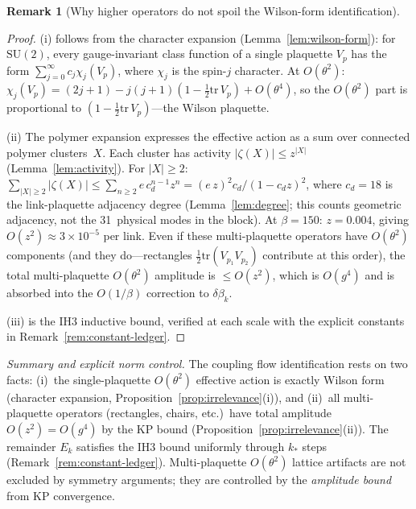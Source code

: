 \documentclass[11pt]{article}
\theoremstyle{definition}
\newtheorem{remark}[theorem]{Remark}
\newcommand{\SU}{\mathrm{SU}}
\newcommand{\tr}{\mathrm{tr}}
\begin{document}
\begin{remark}[Why higher operators do not spoil the Wilson-form identification]
\begin{proof}
(i) follows from the character expansion
(Lemma~\ref{lem:wilson-form}): for $\SU(2)$, every
gauge-invariant class function of a single plaquette
$V_p$ has the form
$\sum_{j=0}^\infty c_j\chi_j(V_p)$, where $\chi_j$ is
the spin-$j$ character.  At $O(\theta^2)$:
$\chi_j(V_p)=(2j+1)-j(j+1)(1-\frac{1}{2}\tr\,V_p)+O(\theta^4)$,
so the $O(\theta^2)$ part is proportional to
$(1-\frac{1}{2}\tr\,V_p)$---the Wilson plaquette.

(ii) The polymer expansion expresses the effective action as a
sum over connected polymer clusters~$X$.  Each cluster has activity
$|\zeta(X)|\le z^{|X|}$ (Lemma~\ref{lem:activity}).  For $|X|\ge 2$:
$\sum_{|X|\ge 2}|\zeta(X)|\le\sum_{n\ge 2}e\,c_d^{n-1}z^n
=(e\,z)^2c_d/(1-c_d z)^2$,
where $c_d=18$ is the link-plaquette adjacency degree
(Lemma~\ref{lem:degree}; this counts geometric adjacency,
not the 31~physical modes in the block).
At $\beta=150$: $z=0.004$, giving $O(z^2)\approx 3\times 10^{-5}$
per link.  Even if these multi-plaquette operators have
$O(\theta^2)$ components (and they do---rectangles
$\frac{1}{2}\tr(V_{p_1}V_{p_2})$ contribute at this order),
the total multi-plaquette $O(\theta^2)$ amplitude is $\le O(z^2)$,
which is $O(g^4)$ and is absorbed into the $O(1/\beta)$
correction to $\delta\beta_k$.

(iii) is the IH3 inductive bound, verified at each scale with
the explicit constants in Remark~\ref{rem:constant-ledger}.
\end{proof}

\emph{Summary and explicit norm control.}
The coupling flow identification rests on two facts:
(i)~the single-plaquette $O(\theta^2)$ effective action is
exactly Wilson form (character expansion,
Proposition~\ref{prop:irrelevance}(i)), and
(ii)~all multi-plaquette operators (rectangles, chairs, etc.)\
have total amplitude $O(z^2)=O(g^4)$ by the KP bound
(Proposition~\ref{prop:irrelevance}(ii)).
The remainder $E_k$ satisfies the IH3 bound uniformly
through $k_*$ steps (Remark~\ref{rem:constant-ledger}).
Multi-plaquette $O(\theta^2)$ lattice artifacts are
not excluded by symmetry arguments; they are
controlled by the \emph{amplitude bound} from KP convergence.


\end{remark}
\end{document}

